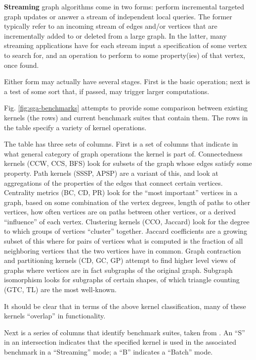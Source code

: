 \textbf{Streaming} graph algorithms come in two forms: perform incremental targeted graph updates or answer a stream of independent local queries. The former typically refer to an incoming stream of edges and/or vertices that are incrementally added to or deleted from a large graph. In the latter, many streaming applications have for each stream input a specification of some vertex to search for, and an operation to perform to some property(ies) of that vertex, once found. 

Either form may actually have several stages. First is the basic operation; next is a test of some sort that, if passed, may trigger larger computations.

Fig. \ref{fig:sga-benchmarks} attempts to provide some comparison between existing kernels (the rows) and current benchmark suites that contain them. The rows in the table specify a variety of kernel operations.

The table has three sets of columns. First is a set of columns that indicate in what general category of graph operations the kernel is part of. Connectedness kernels (CCW, CCS, BFS) look for subsets of the graph whose edges satisfy some property. Path kernels (SSSP, APSP) are a variant of this, and look at aggregations of the properties of the edges that connect certain vertices. Centrality metrics (BC, CD, PR) look for the ``most important'' vertices in a graph, based on some combination of the vertex degrees, length of paths to other vertices, how often vertices are on paths between other vertices, or a derived ``influence'' of each vertex. Clustering kernels (CCO, Jaccard) look for the degree to which groups of vertices ``cluster'' together. Jaccard coefficients \cite{bigdata:bank-cole:jaccard,bigdata:burkhardt:jaccard,kogge-refs:GABB16-Jaccard} are a growing subset of this where for pairs of vertices what is computed is the fraction of all neighboring vertices that the two vertices have in common.  Graph contraction and partitioning kernels (CD, GC, GP) attempt to find higher level views of graphs where vertices are in fact subgraphs of the original graph. Subgraph isomorphism looks for subgraphs of certain shapes, of which triangle counting (GTC, TL) are the most well-known.

It should be clear that in terms of the above kernel classification, many of these kernels ``overlap'' in functionality.

Next is a series of columns that identify benchmark suites, taken from  \cite{bigdata:burkhardt:jaccard,sga-firehose,sga-graph500,sga-graphblas,sga-graphchallenge,sga-gap,sga-graphanalysis,
kepner-gilbert,sga-stinger}. An ``S'' in an intersection indicates that the specified kernel is used in the associated benchmark in a ``Streaming'' mode; a ``B'' indicates a ``Batch'' mode.

